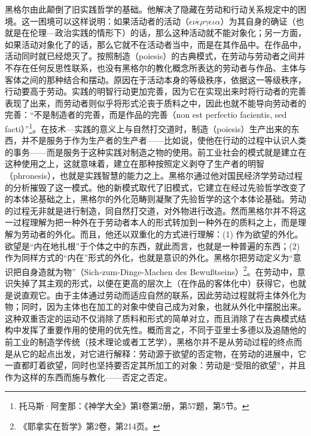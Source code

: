 黑格尔由此颠倒了旧实践哲学的基础。他解决了隐藏在劳动和行动关系规定中的困境。这一困境可以这样说明：如果活动者的活动（$\acute{\epsilon}\nu\acute{\epsilon}\rho\gamma\epsilon\iota\alpha$）为其自身的确证（也就是在伦理—政治实践的情形下）的话，那么这种活动就不能对象化；另一方面，如果活动对象化了的话，那么它就不在活动者当中，而是在其作品中。在作品中，活动同时就已经熄灭了。按照制造（poiesis）的古典模式，在劳动与劳动者之间并不存在任何反思性联系，也没有黑格尔的教化概念所表达的劳动者与作品、主体与客体之间的那种结合和摆动。原因在于活动本身的等级秩序，依据这一等级秩序，行动要高于劳动。实践的明智行动更加完善，因为它在实现出来时将行动者的完善表现了出来，而劳动者则似乎将形式沦丧于质料之中，因此也就不能导向劳动者的完善：“不是制造者的完善，而是作品的完善（non est perfectio facientis, sed facti）”\footnote{托马斯·阿奎那：《神学大全》第I卷第2册，第57题，第5节。}。在技术—实践的意义上与自然打交道时，制造（poiesis）生产出来的东西，并不是服务于作为生产者的生产者——比如说，使他在行动的过程中认识人类的事务——而是服务于这种实践对制造之物的使用。前工业社会的模式就是建立在这种使用之上，这就意味着，建立在那种按照定义剥夺了生产者的明智（phronesis），也就是实践智慧的能力之上。黑格尔通过他对国民经济学劳动过程的分析摧毁了这一模式。他的新模式取代了旧模式，它建立在经过先验哲学改变了的本体论基础之上，黑格尔的外化范畴则凝聚了先验哲学的这个本体论基础。劳动的过程无非就是进行制造，同自然打交道，对外物进行改造。然而黑格尔并不将这一过程理解为把一种外在于劳动者本人的形式转加到一种外在的质料之上，而是理解为劳动者的外化。而且，他还以双重化的方式进行理解：(1) 作为欲望的外化。欲望是“内在地扎根”于个体之中的东西，就此而言，也就是一种普遍的东西；(2) 作为同样方式的“内在”形式的外化，也就是意识的外化。黑格尔把劳动定义为“意识把自身造就为物”（Sich-zum-Dinge-Machen des Bewußtseins）\footnote{《耶拿实在哲学》第2卷，第214页。}。在劳动中，意识失掉了其主观的形式，以便在更高的层次上（在作品的客体化中）获得它，也就是说直观它。由于主体通过劳动而适应自然的联系，因此劳动过程就将主体外化为物；同时，因为主体也在加工的对象中使自己成为对象，也就从外化中摆脱出来。这种双重否定的运动不仅消除了质料和形式的简单对立，而且消除了在古典模式结构中发挥了重要作用的使用的优先性。概而言之，不同于亚里士多德以及追随他的前工业的制造学传统（技术理论或者工艺学），黑格尔并不是从劳动过程的终点而是从它的起点出发，对它进行解释：劳动源于欲望的否定物，在劳动的进展中，它一直都盯着欲望，同时也坚持要否定其所加工的对象：劳动是“受阻的欲望”，并且作为这样的东西而施与教化——否定之否定。

